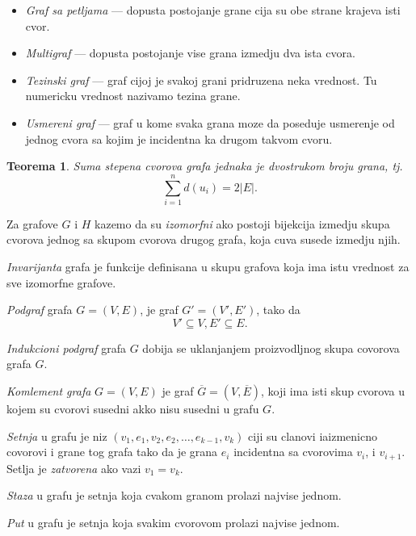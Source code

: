 \documentclass[12p, a4paper]{article}
\newtheorem*{theorem}{Teorema}
\begin{document}
\begin{multicols}{2}
    \begin{itemize}
        \itemsep0em
        \item \emph{Graf sa petljama} --- dopusta postojanje grane cija su obe
              strane krajeva isti cvor.
        \item \emph{Multigraf} --- dopusta postojanje vise grana izmedju 
              dva ista cvora.
        \item \emph{Tezinski graf} --- graf cijoj je svakoj grani 
              pridruzena neka vrednost. Tu numericku vrednost nazivamo tezina
              grane.
        \item \emph{Usmereni graf} --- graf u kome svaka grana moze da 
              poseduje usmerenje od jednog cvora sa kojim je incidentna ka 
              drugom takvom cvoru.
    \end{itemize}
    
    \begin{theorem}
        Suma stepena cvorova grafa jednaka je dvostrukom broju grana, tj.
        \[
            \sum_{i = 1}^n d(u_i) = 2|E|.
        \]
    \end{theorem}

    Za grafove $G$ i $H$ kazemo da su \emph{izomorfni} ako postoji bijekcija
    izmedju skupa cvorova jednog sa skupom cvorova drugog grafa, koja
    cuva susede izmedju njih.

    \emph{Invarijanta} grafa je funkcije definisana u skupu grafova koja
    ima istu vrednost za sve izomorfne grafove.

    \emph{Podgraf} grafa $G = (V, E)$, je graf $G' = (V', E')$, tako da
    \[
        V' \subseteq V, E' \subseteq E.
    \]

    \emph{Indukcioni podgraf} grafa $G$ dobija se uklanjanjem proizvodljnog 
    skupa covorova grafa $G$.

    \emph{Komlement grafa} $G = (V, E)$ je graf 
    $\overline{G} = (V, \overline{E})$, koji ima isti skup cvorova u kojem
    su cvorovi susedni akko nisu susedni u grafu $G$.

    \emph{Setnja} u grafu je niz $(v_1, e_1, v_2, e_2, \ldots, e_{k-1}, v_k)$
    ciji su clanovi iaizmenicno covorovi i grane tog grafa tako da je grana
    $e_i$ incidentna sa cvorovima $v_i$, i $v_{i+1}$. Setlja je 
    \emph{zatvorena} ako vazi $v_1 = v_k$.

    \emph{Staza} u grafu je setnja koja cvakom granom prolazi najvise jednom.

    \emph{Put} u grafu je setnja koja svakim cvorovom prolazi najvise jednom.


\end{multicols}
\end{document}
